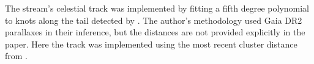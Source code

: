 The stream's celestial track was implemented by fitting a fifth degree polynomial to knots along the tail detected by \citet[][data provided by A. Sollima in priv. comm]{Sollima2020}. The author's methodology used Gaia DR2 parallaxes in their inference, but the distances are not provided explicitly in the paper. Here the track was implemented using the most recent cluster distance from \citet{Baumgardt2021}.
